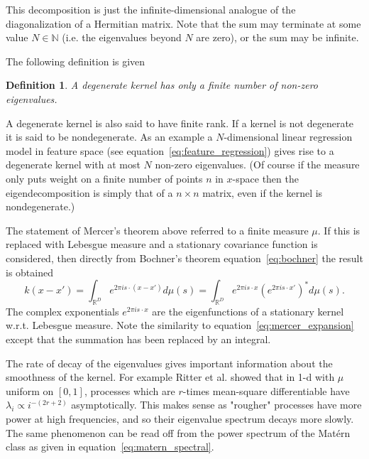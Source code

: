 \documentclass[11pt]{book}
\newtheorem{definition}[theorem]{Definition}
\begin{document}
This decomposition is just the infinite-dimensional analogue of the diagonalization of a Hermitian matrix. Note that the sum may terminate at some value $N \in \mathbb{N}$ (i.e. the eigenvalues beyond $N$ are zero), or the sum may be infinite.

The following definition is given \cite{press1992}

\begin{definition}
\label{def:degenerate}
A degenerate kernel has only a finite number of non-zero eigenvalues.
\end{definition}

A degenerate kernel is also said to have finite rank. If a kernel is not degenerate it is said to be nondegenerate. As an example a $N$-dimensional linear regression model in feature space (see equation~\eqref{eq:feature_regression}) gives rise to a degenerate kernel with at most $N$ non-zero eigenvalues. (Of course if the measure only puts weight on a finite number of points $n$ in $x$-space then the eigendecomposition is simply that of a $n \times n$ matrix, even if the kernel is nondegenerate.)

The statement of Mercer's theorem above referred to a finite measure $\mu$. If this is replaced with Lebesgue measure and a stationary covariance function is considered, then directly from Bochner's theorem equation~\eqref{eq:bochner} the result is obtained
\begin{equation}
\label{eq:stationary_eigenfunction}
k(x - x') = \int_{\mathbb{R}^D} e^{2\pi i s \cdot (x-x')} d\mu(s) = \int_{\mathbb{R}^D} e^{2\pi i s \cdot x} \left(e^{2\pi i s \cdot x'}\right)^* d\mu(s).
\end{equation}
The complex exponentials $e^{2\pi i s \cdot x}$ are the eigenfunctions of a stationary kernel w.r.t. Lebesgue measure. Note the similarity to equation~\eqref{eq:mercer_expansion} except that the summation has been replaced by an integral.

The rate of decay of the eigenvalues gives important information about the smoothness of the kernel. For example Ritter et al. \cite{ritter1995} showed that in 1-d with $\mu$ uniform on $[0, 1]$, processes which are $r$-times mean-square differentiable have $\lambda_i \propto i^{-(2r+2)}$ asymptotically. This makes sense as "rougher" processes have more power at high frequencies, and so their eigenvalue spectrum decays more slowly. The same phenomenon can be read off from the power spectrum of the Matérn class as given in equation~\eqref{eq:matern_spectral}.
\end{document}
